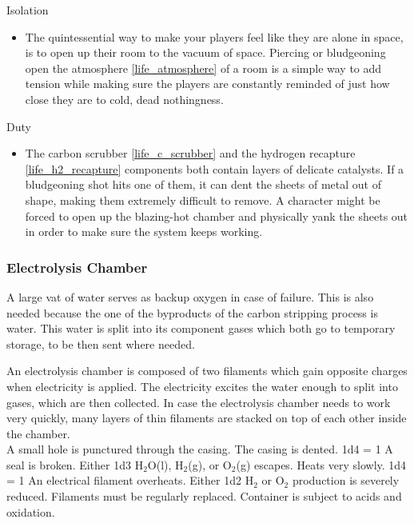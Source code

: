 \documentclass[a4paper]{article}
\begin{document}
\begin{minipage}[t]{0.4\linewidth}
Isolation
\begin{itemize}
\item The quintessential way to make your players feel like they are alone in space, is to open up their room to the vacuum of space. Piercing or bludgeoning open the atmosphere \ref{life_atmosphere} of a room is a simple way to add tension while making sure the players are constantly reminded of just how close they are to cold, dead nothingness.
\end{itemize}
\end{minipage}
\begin{minipage}[t]{0.4\linewidth}
Duty
\begin{itemize}
\item The carbon scrubber \ref{life_c_scrubber} and the hydrogen recapture \ref{life_h2_recapture} components both contain layers of delicate catalysts. If a bludgeoning shot hits one of them, it can dent the sheets of metal out of shape, making them extremely difficult to remove. A character might be forced to open up the blazing-hot chamber and physically yank the sheets out in order to make sure the system keeps working.
\end{itemize}
\end{minipage}

\hspace{-18pt} \subsubsection{Electrolysis Chamber} \label{life_electrolysis} \vspace{-0.2cm}
A large vat of water serves as backup oxygen in case of failure. This is also needed because the one of the byproducts of the carbon stripping process is water. This water is split into its component gases which both go to temporary storage, to be then sent where needed.

An electrolysis chamber is composed of two filaments which gain opposite charges when electricity is applied. The electricity excites the water enough to split into gases, which are then collected. In case the electrolysis chamber needs to work very quickly, many layers of thin filaments are stacked on top of each other inside the chamber. 
\\ \pbhw
{A small hole is punctured through the casing. \newline {}}
{The casing is dented. \newline 1d4 = 1 A seal is broken. Either 1d3 H$_2$O(l), H$_2$(g), or O$_2$(g) escapes.}
{Heats very slowly. \newline 1d4 = 1 An electrical filament overheats. Either 1d2 H$_2$ or O$_2$ production is severely reduced.}
{Filaments must be regularly replaced. Container is subject to acids and oxidation.}
\end{document}
